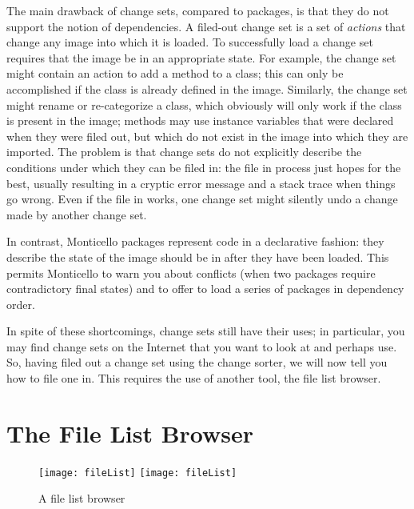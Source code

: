 \documentclass[a4paper,10pt,twoside]{book}
\begin{document}
The main drawback of change sets, compared to  packages, is that they do not support the notion of dependencies.
A filed-out change set is a set of \emph{actions} that change any image into which it is loaded. To successfully load a change set requires that the image be in an appropriate state.
For example, the change set might contain an action to add a method to a class; this can only be accomplished if the class is already defined in the image.
Similarly, the change set might rename or re-categorize a class, which obviously will only work if the class is present in the image; methods may use instance variables that were declared when they were filed out, but which do not exist in the image into which they are imported.
The problem is that change sets do not explicitly describe the conditions under which they can be filed in:
the file in process just hopes for the best, usually resulting in a cryptic error message and a stack trace when things go wrong.
Even if the file in works, one change set might silently undo a change made by another change set.

In contrast, Monticello packages represent code in a declarative fashion: they describe the state of the image should be in after they have been loaded.
This permits Monticello to warn you about conflicts (when two packages require contradictory final states)
and to offer to load a series of packages in dependency order.

In spite of these shortcomings, change sets still have their uses; in particular, you may find change sets on the Internet that you want to look at and perhaps use.
So, having filed out a change set using the change sorter, we will now tell you how to file one in.
This requires the use of another tool, the file list browser.


\section{The File List Browser}

\begin{figure}[btp]
	\begin{center}
	\ifluluelse
		{\texttt{[image: fileList]}}
		{\texttt{[image: fileList]}}
	\end{center}
	\caption{A file list browser}
	\label{fig:fileList}
\end{figure}
\end{document}
